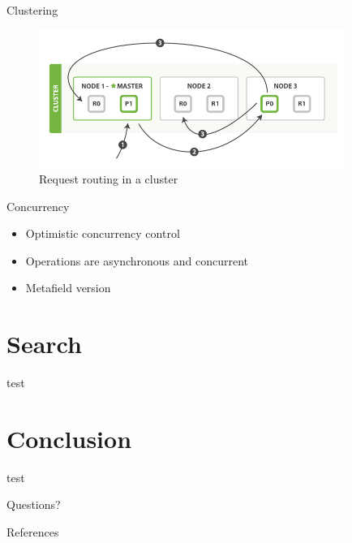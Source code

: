 \documentclass[10pt]{beamer}
\begin{document}
\begin{frame}{Clustering}
	\begin{figure}
		\centering\includegraphics[width=10cm]{cluster_data}
		\caption{Request routing in a cluster}
	\end{figure}
\end{frame}

\begin{frame}{Concurrency}
	\begin{itemize}
		\item Optimistic concurrency control
		\item Operations are asynchronous and concurrent
		\item Metafield version
	\end{itemize}
\end{frame}


\section{Search}
\begin{frame}{test}
\end{frame}

\section{Conclusion}
\begin{frame}{test}
\end{frame}

\begin{frame}[standout]
  Questions?
\end{frame}

\begin{frame}[allowframebreaks]{References}

  
  

\end{frame}
\end{document}
